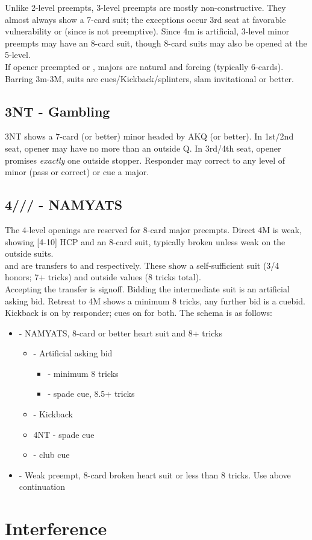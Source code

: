 \documentclass[12pt]{report}
\newcommand{\n}{\\}
\newcommand{\q}[1]{\multido{}{#1}{\qquad}}
\newcommand{\ul}[1]{\begin{itemize}#1\end{itemize}}
\newcommand{\li}[1]{\item[~] \q{#1}}
\newcommand{\bidsection}[2]{\section{\texorpdfstring{#1}{#2}}}
\begin{document}
    Unlike 2-level preempts, 3-level preempts are mostly non-constructive.  They almost always show a 7-card suit; the exceptions occur 3rd seat at favorable vulnerability or  (since  is not preemptive).  Since 4m is artificial, 3-level minor preempts may have an 8-card suit, though 8-card suits may also be opened at the 5-level. \n

    If opener preempted  or , majors are natural and forcing (typically 6-cards).  Barring 3m-3M, suits are cues/Kickback/splinters, slam invitational or better.

\bidsection{3NT - Gambling}{3NT - Gambling} \label{2:12}

    3NT shows a 7-card (or better) minor headed by AKQ (or better).  In 1st/2nd seat, opener may have no more than an outside Q.  In 3rd/4th seat, opener promises \textit{exactly} one outside stopper. Responder may correct to any level of minor (pass or correct) or cue a major.

\bidsection{4\cl{}/\di{}/\he{}/\sp{} - NAMYATS}{4♣/♢/♡/♠ - NAMYATS} \label{2:13}

    The 4-level openings are reserved for 8-card major preempts.  Direct 4M is weak, showing [4-10] HCP and an 8-card suit, typically broken unless weak on the outside suits.\n

     and  are transfers to  and  respectively.  These show a self-sufficient suit (3/4 honors; 7+ tricks) and outside values (8 tricks total).\n

    Accepting the transfer is signoff.  Bidding the intermediate suit is an artificial asking bid.  Retreat to 4M shows a minimum 8 tricks, any further bid is a cuebid.\n

    Kickback is on by responder; cues on for both.  The schema is as follows:

    \ul {
        \li0  - NAMYATS, 8-card or better heart suit and 8+ tricks
        \ul {
            \li0 \di4 - Artificial asking bid
            \ul {
                \li0 \he4 - minimum 8 tricks
                \li0 \sp4 - spade cue, 8.5+ tricks
            }
            \li0 \sp4 - Kickback
            \li0 4NT - spade cue
            \li0 \cl5 - club cue
        }
        \li0 \he4 - Weak preempt, 8-card broken heart suit or less than 8 tricks.  Use above continuation
    }

\chapter{Interference}  \label{3}
\end{document}
